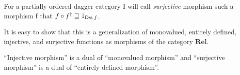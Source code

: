 \begin{defn}
For a partially ordered dagger category
I will call \emph{surjective} morphism such a morphism f that $f\circ f^{\dagger}\sqsupseteq1_{\operatorname{Dst} f}$.\end{defn}
\begin{rem}
It is easy to show that this is a generalization of monovalued, entirely
defined, injective, and surjective functions as morphisms of the category
$\mathbf{Rel}$.\end{rem}
\begin{obvious}
``Injective morphism'' is a dual of ``monovalued morphism'' and
``surjective morphism'' is a dual of ``entirely defined morphism''.\end{obvious}

